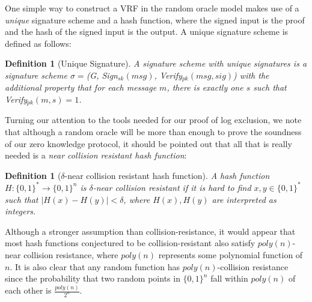 \documentclass[letterpaper,twocolumn,10pt]{article}
\newtheorem{definition}[theorem]{Definition}
\begin{document}
One simple way to construct a VRF in the random oracle model makes use of a \textit{unique} signature scheme and a hash function, where the signed input is the proof and the hash of the signed input is the output. A unique signature scheme is defined as follows:
\begin{definition}[Unique Signature]
A signature scheme with unique signatures is a signature scheme $\sigma =$(G, Sign$_{sk}(msg)$, Verify$_{pk}(msg, sig)$) with the additional property that for each message $m$, there is exactly one $s$ such that Verify$_{pk}(m, s)=1$.
\end{definition}

Turning our attention to the tools needed for our proof of log exclusion, we note that although a random oracle will be more than enough to prove the soundness of our zero knowledge protocol, it should be pointed out that all that is really needed is a \emph{near collision resistant hash function}:
\begin{definition}[$\delta$-near collision resistant hash function]
A hash function $H: \{0,1\}^*\rightarrow \{0,1\}^n$ is $\delta$-near collision resistant if it is hard to find $x,y\in\{0,1\}^*$ such that $|H(x)-H(y)|<\delta$, where $H(x), H(y)$ are interpreted as integers.
\end{definition}
Although a stronger assumption than collision-resistance, it would appear that most hash functions conjectured to be collision-resistant also satisfy $poly(n)$-near collision resistance, where $poly(n)$ represents some polynomial function of $n$. It is also clear that any random function has $poly(n)$-collision resistance since the probability that two random points in $\{0,1\}^n$ fall within $poly(n)$ of each other is $\frac{poly(n)}{2^n}$.
\end{document}
